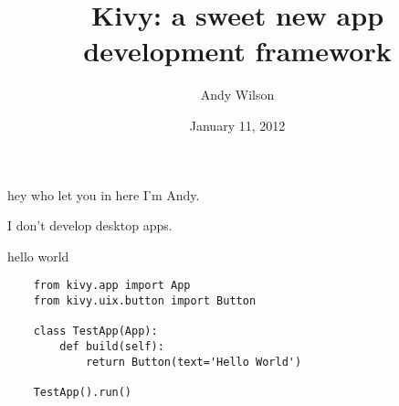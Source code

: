 \documentclass{beamer}
\title[Kivy]{Kivy: a sweet new app development framework}
\author[Andy Wilson]{Andy Wilson}
\date[January 2012]{January 11, 2012}
\begin{document}
\begin{frame}[plain]
  \titlepage
\end{frame}


\begin{frame}{hey who let you in here}
I'm Andy.

I don't develop desktop apps.
\end{frame}



\begin{frame}[fragile]{hello world}
  \begin{verbatim}
    from kivy.app import App
    from kivy.uix.button import Button

    class TestApp(App):
        def build(self):
            return Button(text='Hello World')

    TestApp().run()
  \end{verbatim}
\end{frame}
\end{document}
